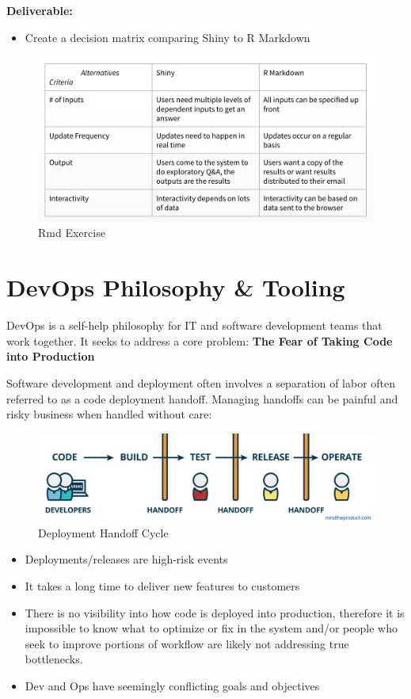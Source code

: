 \documentclass[]{book}
\providecommand{\tightlist}{%
  \setlength{\itemsep}{0pt}\setlength{\parskip}{0pt}}
\theoremstyle{definition}
\theoremstyle{definition}
\theoremstyle{definition}
\theoremstyle{remark}
\begin{document}
\textbf{Deliverable:}

\begin{itemize}
\tightlist
\item
  Create a decision matrix comparing Shiny to R Markdown
\end{itemize}

\begin{figure}
\centering
\includegraphics{imgs/shiny-alt/rmd-answers.png}
\caption{Rmd Exercise}
\end{figure}

\hypertarget{devops-philosophy-tooling}{%
\chapter{DevOps Philosophy \& Tooling}\label{devops-philosophy-tooling}}

DevOps is a self-help philosophy for IT and software development teams
that work together. It seeks to address a core problem: \textbf{The Fear
of Taking Code into Production}

Software development and deployment often involves a separation of labor
often referred to as a code deployment handoff. Managing handoffs can be
painful and risky business when handled without care:

\begin{figure}
\centering
\includegraphics{imgs/devops/code-handoff.png}
\caption{Deployment Handoff Cycle}
\end{figure}

\begin{itemize}
\tightlist
\item
  Deployments/releases are high-risk events
\item
  It takes a long time to deliver new features to customers
\item
  There is no visibility into how code is deployed into production,
  therefore it is impossible to know what to optimize or fix in the
  system and/or people who seek to improve portions of workflow are
  likely not addressing true bottlenecks.
\item
  Dev and Ops have seemingly conflicting goals and objectives
\end{itemize}
\end{document}
